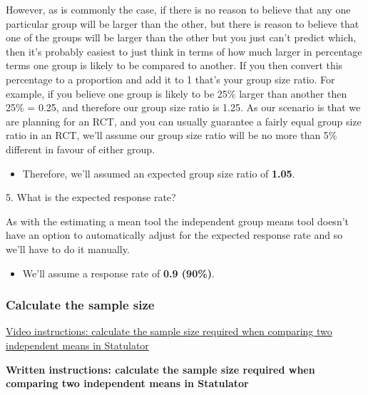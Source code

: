 \documentclass[
]{book}
\providecommand{\tightlist}{%
  \setlength{\itemsep}{0pt}\setlength{\parskip}{0pt}}
\begin{document}
However, as is commonly the case, if there is no reason to believe that any one particular group will be larger than the other, but there is reason to believe that one of the groups will be larger than the other but you just can't predict which, then it's probably easiest to just think in terms of how much larger in percentage terms one group is likely to be compared to another. If you then convert this percentage to a proportion and add it to 1 that's your group size ratio. For example, if you believe one group is likely to be 25\% larger than another then 25\% = 0.25, and therefore our group size ratio is 1.25. As our scenario is that we are planning for an RCT, and you can usually guarantee a fairly equal group size ratio in an RCT, we'll assume our group size ratio will be no more than 5\% different in favour of either group.

\begin{itemize}
\tightlist
\item
  Therefore, we'll assumed an expected group size ratio of \textbf{1.05}.
\end{itemize}

5. What is the expected response rate?

As with the estimating a mean tool the independent group means tool doesn't have an option to automatically adjust for the expected response rate and so we'll have to do it manually.

\begin{itemize}
\tightlist
\item
  We'll assume a response rate of \textbf{0.9 (90\%)}.
\end{itemize}

\hypertarget{calculate-the-sample-size}{%
\subsubsection{Calculate the sample size}\label{calculate-the-sample-size}}

\href{https://youtu.be/plKvGmnfUHs}{Video instructions: calculate the sample size required when comparing two independent means in Statulator}

\textbf{Written instructions: calculate the sample size required when comparing two independent means in Statulator}
\end{document}
